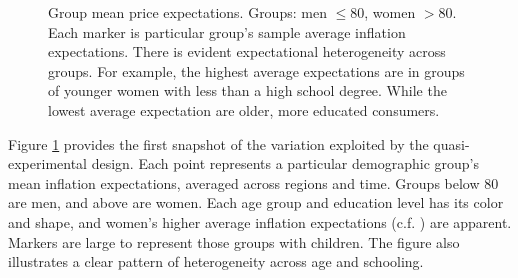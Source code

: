 \documentclass[12pt]{article}
\begin{document}
\begin{figure}
\centering
\caption{Group mean price expectations. Groups: men $\leq 80$, women $>80$. Each marker is particular group's sample average inflation expectations.  There is evident expectational heterogeneity across groups.  For example, the highest average expectations are in groups of younger women with less than a high school degree.  While the lowest average expectation are older, more educated consumers.}\label{fig:GroupMeans}

\end{figure}

Figure \ref{fig:GroupMeans} provides the first snapshot of the variation exploited by the quasi-experimental design. Each point represents a particular demographic group's mean inflation expectations, averaged across regions and time. Groups below 80 are men, and above are women. Each age group and education level has its color and shape, and women's higher average inflation expectations (c.f. \cite{BryanVenkatu}) are apparent. Markers are large to represent those groups with children. The figure also illustrates a clear pattern of heterogeneity across age and schooling.
\end{document}
